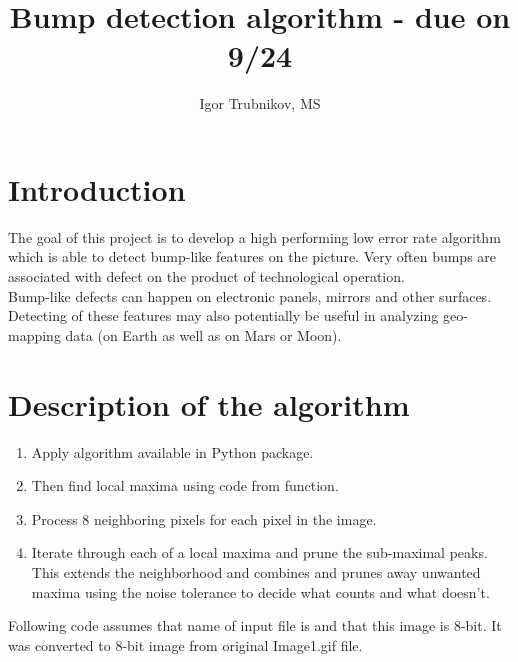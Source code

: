 \documentclass[letterpaper]{article}
\title{Bump detection algorithm - due on 9/24}
\author{Igor Trubnikov, MS}
\begin{document}
\maketitle
\tableofcontents
\newpage

\section{Introduction}
The goal of this project is to develop a high performing low error rate algorithm which is able to detect bump-like features on the picture. Very often bumps are associated with defect on the product of technological operation.\\
Bump-like defects can happen on electronic panels, mirrors and other surfaces.\\
Detecting of these features may also potentially be useful in analyzing geo-mapping data (on Earth as well as on Mars or Moon).\\

\newpage

\section{Description of the algorithm}

\begin{enumerate}
	\item Apply  algorithm available in Python  package.
	\item Then find local maxima using code from  function.
	\item Process 8 neighboring pixels for each pixel in the image.
	\item Iterate through each of a local maxima and prune the sub-maximal peaks.\\
	This extends the neighborhood and combines and prunes away unwanted maxima using the noise tolerance to decide what counts and what doesn't.
\end{enumerate}

Following code assumes that name of input file is  and that this image is 8-bit. It was converted to 8-bit image from original Image1.gif file.

\newpage
\end{document}
